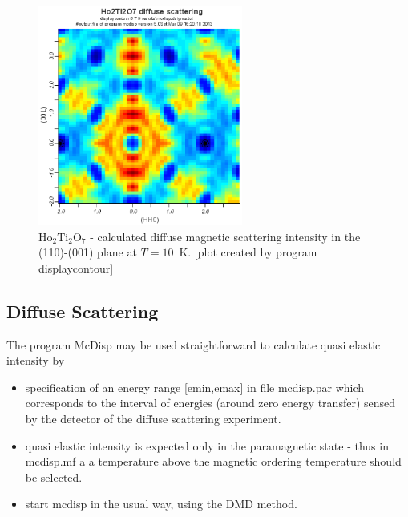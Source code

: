 




\begin{figure}[t]%
\begin{center}\leavevmode
\includegraphics[angle=-0, width=0.6\textwidth]{figsrc/ho2ti2o7diffuse.eps}
\end{center}
\caption{\label{ho2ti2o7diffuse}
Ho$_2$Ti$_2$O$_7$ - calculated diffuse magnetic scattering intensity in the (110)-(001)
 plane at $T=10$~K.
[plot created by program {\prg displaycontour}]
}
\end{figure}

\subsection{Diffuse Scattering}

The program {\prg McDisp} may be used straightforward to calculate quasi elastic intensity
 by

\begin{itemize}
\item
 specification of an energy
range [emin,emax] in file {\prg mcdisp.par} which corresponds to the interval of energies (around zero
energy transfer) sensed by the detector of the diffuse scattering experiment. 
\item
 quasi elastic intensity is expected only in the paramagnetic state - thus in {\prg mcdisp.mf} a
 a temperature above the magnetic ordering temperature should be selected.
\item start {\prg mcdisp} in the usual way, using the DMD method.
\end{itemize} 
 
